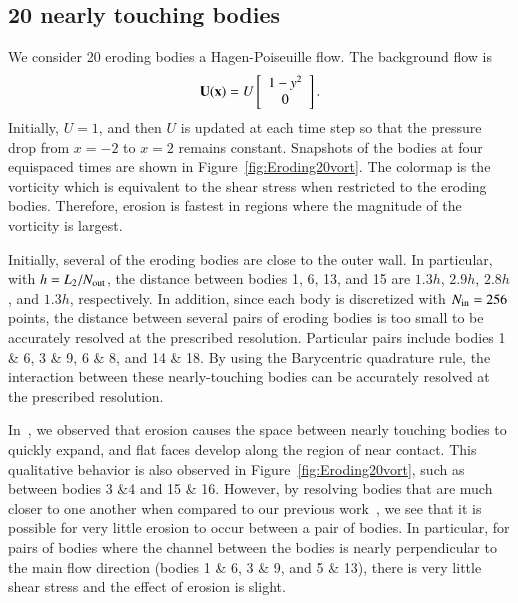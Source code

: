 \documentclass[preprint, 10pt]{elsarticle}
\begin{document}
\subsection{20 nearly touching bodies}
We consider 20 eroding bodies a Hagen-Poiseuille flow.  The background
flow is 
\begin{align}
  {\mathbf{U}}({\mathbf{x}})=U \left[
  \begin{array}{c}
    1-y^2 \\ 0
  \end{array}
  \right].
\end{align}
Initially, $U=1$, and then $U$ is updated at each time step so that the
pressure drop from $x=-2$ to $x=2$ remains constant.  Snapshots of the
bodies at four equispaced times are shown in
Figure~\ref{fig:Eroding20vort}.   The colormap is the vorticity which is
equivalent to the shear stress when restricted to the eroding bodies.
Therefore, erosion is fastest in regions where the magnitude of the
vorticity is largest.

Initially, several of the eroding bodies are close to the outer wall.
In particular, with $h=L_2/N_{\mathrm{out}}$, the distance between bodies 1, 6,
13, and 15 are $1.3h$, $2.9h$, $2.8h$, and $1.3h$, respectively.  In
addition, since each body is discretized with $N_{\mathrm{in}}=256$ points, the
distance between several pairs of eroding bodies is too small to be
accurately resolved at the prescribed resolution.  Particular pairs
include bodies 1 \& 6, 3 \& 9, 6 \& 8, and 14 \& 18.  By using the
Barycentric quadrature rule, the interaction between these
nearly-touching bodies can be accurately resolved at the prescribed
resolution.

In~\cite{qua-moo2018}, we observed that erosion causes the space
between nearly touching bodies to quickly expand, and flat faces develop
along the region of near contact.  This qualitative behavior is also
observed in Figure~\ref{fig:Eroding20vort}, such as between bodies 3
\&4 and 15 \& 16.  However, by resolving bodies that are
much closer to one another when compared to our previous
work~\cite{qua-moo2018}, we see that it is possible for very little
erosion to occur between a pair of bodies.  In particular, for pairs of
bodies where the channel between the bodies is nearly perpendicular to
the main flow direction (bodies 1 \& 6, 3 \& 9, and 5 \& 13), there is
very little shear stress and the effect of erosion is slight. 
\end{document}
